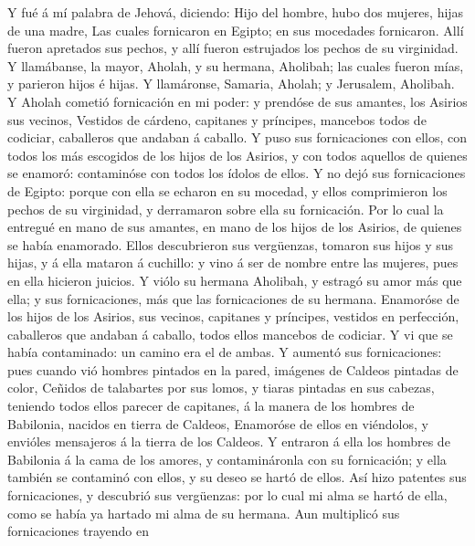  Y fué á mí palabra de Jehová, diciendo: 
Hijo del hombre, hubo dos mujeres, hijas de una madre, 
Las cuales fornicaron en Egipto; en sus mocedades fornicaron. Allí
fueron apretados sus pechos, y allí fueron estrujados los pechos de su
virginidad.  Y llamábanse, la mayor, Aholah, y su hermana,
Aholibah; las cuales fueron mías, y parieron hijos é hijas. Y
llamáronse, Samaria, Aholah; y Jerusalem, Aholibah.  Y
Aholah cometió fornicación en mi poder: y prendóse de sus amantes, los
Asirios sus vecinos,  Vestidos de cárdeno, capitanes y
príncipes, mancebos todos de codiciar, caballeros que andaban á caballo.
 Y puso sus fornicaciones con ellos, con todos los más
escogidos de los hijos de los Asirios, y con todos aquellos de quienes
se enamoró: contaminóse con todos los ídolos de ellos.  Y
no dejó sus fornicaciones de Egipto: porque con ella se echaron en su
mocedad, y ellos comprimieron los pechos de su virginidad, y derramaron
sobre ella su fornicación.  Por lo cual la entregué en
mano de sus amantes, en mano de los hijos de los Asirios, de quienes se
había enamorado.  Ellos descubrieron sus vergüenzas,
tomaron sus hijos y sus hijas, y á ella mataron á cuchillo: y vino á ser
de nombre entre las mujeres, pues en ella hicieron juicios.
 Y viólo su hermana Aholibah, y estragó su amor más que
ella; y sus fornicaciones, más que las fornicaciones de su hermana.
 Enamoróse de los hijos de los Asirios, sus vecinos,
capitanes y príncipes, vestidos en perfección, caballeros que andaban á
caballo, todos ellos mancebos de codiciar.  Y vi que se
había contaminado: un camino era el de ambas.  Y aumentó
sus fornicaciones: pues cuando vió hombres pintados en la pared,
imágenes de Caldeos pintadas de color,  Ceñidos de
talabartes por sus lomos, y tiaras pintadas en sus cabezas, teniendo
todos ellos parecer de capitanes, á la manera de los hombres de
Babilonia, nacidos en tierra de Caldeos,  Enamoróse de
ellos en viéndolos, y envióles mensajeros á la tierra de los Caldeos.
 Y entraron á ella los hombres de Babilonia á la cama de
los amores, y contamináronla con su fornicación; y ella también se
contaminó con ellos, y su deseo se hartó de ellos.  Así
hizo patentes sus fornicaciones, y descubrió sus vergüenzas: por lo cual
mi alma se hartó de ella, como se había ya hartado mi alma de su
hermana.  Aun multiplicó sus fornicaciones trayendo en
